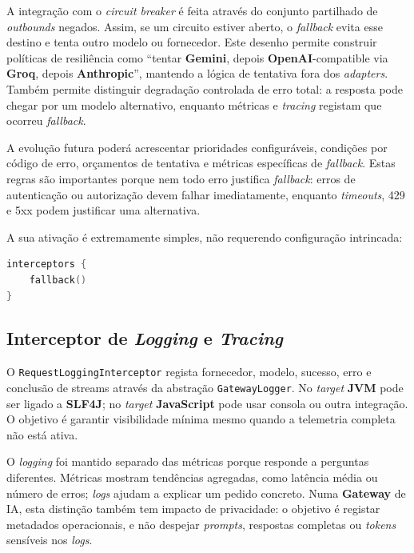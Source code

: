     A integração com o \textit{circuit breaker} é feita através do conjunto partilhado de \textit{outbounds} negados. Assim, se um circuito estiver aberto, o \textit{fallback} evita esse destino e tenta outro modelo ou fornecedor. Este desenho permite construir políticas de resiliência como ``tentar \textbf{Gemini}, depois \textbf{OpenAI}-compatible via \textbf{Groq}, depois \textbf{Anthropic}'', mantendo a lógica de tentativa fora dos \textit{adapters}. Também permite distinguir degradação controlada de erro total: a resposta pode chegar por um modelo alternativo, enquanto métricas e \textit{tracing} registam que ocorreu \textit{fallback}.

    A evolução futura poderá acrescentar prioridades configuráveis, condições por código de erro, orçamentos de tentativa e métricas específicas de \textit{fallback}. Estas regras são importantes porque nem todo erro justifica \textit{fallback}: erros de autenticação ou autorização devem falhar imediatamente, enquanto \textit{timeouts}, 429 e 5xx podem justificar uma alternativa.

    A sua ativação é extremamente simples, não requerendo configuração intrincada:

    \vspace{0.5em}
    \begin{lstlisting}[language=kotlin, caption={DSL de configuração do \textit{interceptor} de \textit{fallback}}]
interceptors {
    fallback()
}
    \end{lstlisting}

    \subsection{Interceptor de \textit{Logging} e \textit{Tracing}}
    O \texttt{RequestLoggingInterceptor} regista fornecedor, modelo, sucesso, erro e conclusão de streams através da abstração \texttt{GatewayLogger}. No \textit{target} \textbf{JVM} pode ser ligado a \textbf{SLF4J}; no \textit{target} \textbf{JavaScript} pode usar consola ou outra integração. O objetivo é garantir visibilidade mínima mesmo quando a telemetria completa não está ativa.

    O \textit{logging} foi mantido separado das métricas porque responde a perguntas diferentes. Métricas mostram tendências agregadas, como latência média ou número de erros; \textit{logs} ajudam a explicar um pedido concreto. Numa \textbf{Gateway} de IA, esta distinção também tem impacto de privacidade: o objetivo é registar metadados operacionais, e não despejar \textit{prompts}, respostas completas ou \textit{tokens} sensíveis nos \textit{logs}.

